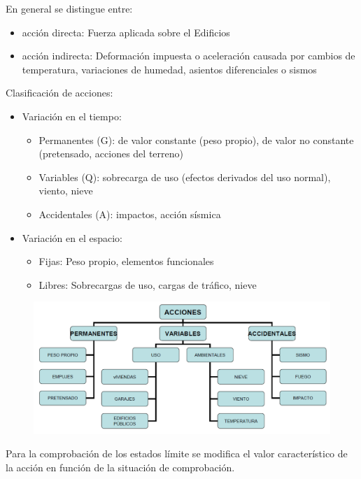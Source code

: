 En general se distingue entre:
\begin{itemize}
    \item acción directa: Fuerza aplicada sobre el Edificios
    \item acción indirecta: Deformación impuesta o aceleración causada por cambios de temperatura, variaciones de humedad, asientos diferenciales o sismos
\end{itemize}

Clasificación de acciones:
\begin{itemize}
    \item Variación en el tiempo:
    \begin{itemize}
        \item Permanentes (G): de valor constante (peso propio), de valor no constante (pretensado, acciones del terreno)
        \item Variables (Q): sobrecarga de uso (efectos derivados del uso normal), viento, nieve
        \item Accidentales (A): impactos, acción sísmica
    \end{itemize}
    \item Variación en el espacio:
    \begin{itemize}
        \item Fijas: Peso propio, elementos funcionales
        \item Libres: Sobrecargas de uso, cargas de tráfico, nieve
    \end{itemize}
\end{itemize}

\begin{figure}[H]
    \centering
    \includegraphics[width = 0.5 \textwidth]{Imagenes/Implementacion a nivel normativo - Clasificacion de acciones.png}
\end{figure}

Para la comprobación de los estados límite se modifica el valor característico de la acción en función de la situación de comprobación.

